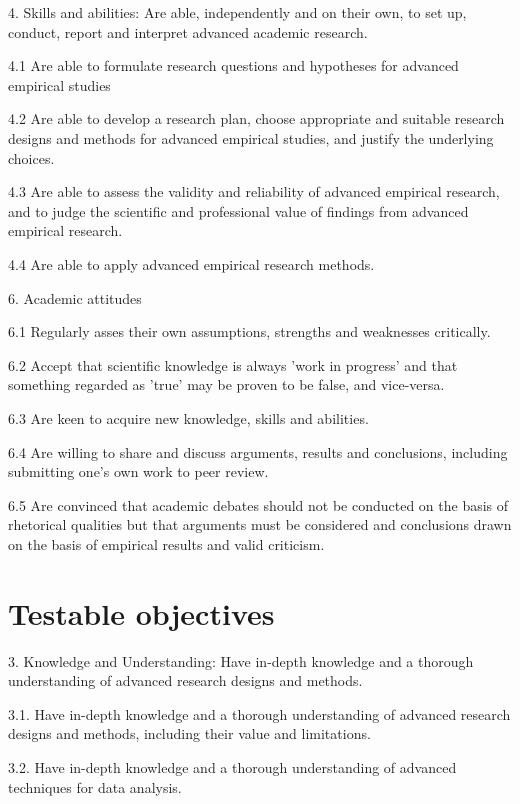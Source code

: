 \documentclass[a4paper,12pt]{report}
\begin{document}
4. Skills and abilities: Are able, independently and on their own, to set up, conduct, report and interpret advanced academic research.


4.1	Are able to formulate research questions and hypotheses for advanced empirical studies


4.2	Are able to develop a research plan, choose appropriate and suitable research designs and methods for advanced empirical studies, and justify the underlying choices. 


4.3	Are able to assess the validity and reliability of advanced empirical research, and to judge the scientific and professional value of findings from advanced empirical research.


4.4	Are able to apply advanced empirical research methods.


6. Academic attitudes


6.1 	Regularly asses their own assumptions, strengths and weaknesses critically.


6.2	Accept that scientific knowledge is always 'work in progress' and that something regarded as 'true' may be proven to be false, and vice-versa.


6.3 	Are keen to acquire new knowledge, skills and abilities. 


6.4 	Are willing to share and discuss arguments, results and conclusions, including submitting one's own work to peer review. 


6.5 	Are convinced that academic debates should not be conducted on the basis of rhetorical qualities but that arguments must be considered and conclusions drawn on the basis of empirical results and valid criticism.





\chapter{Testable objectives}

{\footnotesize{
3. Knowledge and Understanding: Have in-depth knowledge and a thorough understanding of advanced research designs and methods. 


3.1. Have in-depth knowledge and a thorough understanding of advanced research designs and methods, including their value and limitations.


3.2.	Have in-depth knowledge and a thorough understanding of advanced techniques for data analysis.

}}
\end{document}
